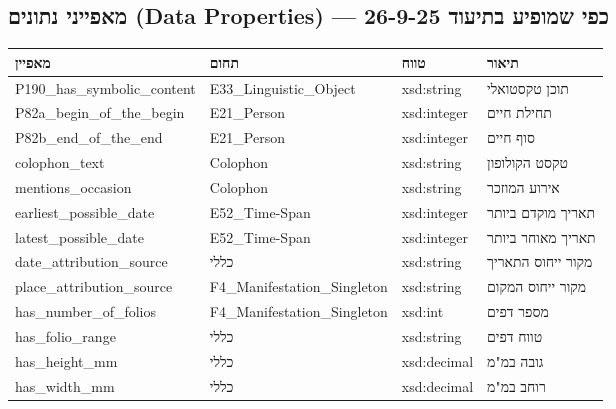 \subsection{מאפייני נתונים (Data Properties) — כפי שמופיע בתיעוד 26-9-25}

{\small
\begin{longtable}{|p{4cm}|p{3.5cm}|p{3.5cm}|p{4.5cm}|}
\hline
\textbf{מאפיין} & \textbf{תחום} & \textbf{טווח} & \textbf{תיאור} \\
\hline
\endhead

\textenglish{P190\_has\_symbolic\_content} & \textenglish{E33\_Linguistic\_Object} & \textenglish{xsd:string} & תוכן טקסטואלי \\
\hline
\textenglish{P82a\_begin\_of\_the\_begin} & \textenglish{E21\_Person} & \textenglish{xsd:integer} & תחילת חיים \\
\hline
\textenglish{P82b\_end\_of\_the\_end} & \textenglish{E21\_Person} & \textenglish{xsd:integer} & סוף חיים \\
\hline
\textenglish{colophon\_text} & \textenglish{Colophon} & \textenglish{xsd:string} & טקסט הקולופון \\
\hline
\textenglish{mentions\_occasion} & \textenglish{Colophon} & \textenglish{xsd:string} & אירוע המוזכר \\
\hline
\textenglish{earliest\_possible\_date} & \textenglish{E52\_Time-Span} & \textenglish{xsd:integer} & תאריך מוקדם ביותר \\
\hline
\textenglish{latest\_possible\_date} & \textenglish{E52\_Time-Span} & \textenglish{xsd:integer} & תאריך מאוחר ביותר \\
\hline
\textenglish{date\_attribution\_source} & כללי & \textenglish{xsd:string} & מקור ייחוס התאריך \\
\hline
\textenglish{place\_attribution\_source} & \textenglish{F4\_Manifestation\_Singleton} & \textenglish{xsd:string} & מקור ייחוס המקום \\
\hline
\textenglish{has\_number\_of\_folios} & \textenglish{F4\_Manifestation\_Singleton} & \textenglish{xsd:int} & מספר דפים \\
\hline
\textenglish{has\_folio\_range} & כללי & \textenglish{xsd:string} & טווח דפים \\
\hline
\textenglish{has\_height\_mm} & כללי & \textenglish{xsd:decimal} & גובה במ"מ \\
\hline
\textenglish{has\_width\_mm} & כללי & \textenglish{xsd:decimal} & רוחב במ"מ \\

\end{longtable}}
